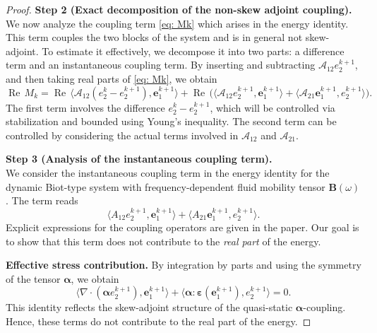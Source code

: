 \documentclass[pdflatex,sn-mathphys-num]{sn-jnl}
\theoremstyle{thmstyleone}%
\theoremstyle{thmstyletwo}%
\theoremstyle{thmstylethree}%
\newcommand{\ip}[2]{\langle #1, #2\rangle}
\newcommand{\Ree}{\operatorname{Re}}
\theoremstyle{definition}
\begin{document}
\begin{proof}[Proof]
		\noindent\textbf{Step 2 (Exact decomposition of the non-skew adjoint coupling).} \\
		\color{black}
		We now analyze the coupling term \eqref{eq: Mk}
		which arises in the energy identity. This term couples the two blocks of the system and is in general not skew-adjoint. To estimate it effectively, we decompose it into two parts: a difference term and an instantaneous coupling term. By inserting and subtracting \( \mathcal{A}_{12} e_2^{k+1} \),
		and then taking real parts of \eqref{eq: Mk}, we obtain 
		\begin{equation}\label{eq:Msplit}
			\Ree\,M_k
			= \Ree\,\ip{\mathcal{A}_{12}(e_2^{k}-e_2^{k+1})}{\bm{e}_{1}^{k+1}}
			+ \Ree\,\big(\ip{\mathcal{A}_{12} e_2^{k+1}}{\bm{e}_{1}^{k+1}} + \ip{\mathcal{A}_{21} \bm{e}_{1}^{k+1}}{e_2^{k+1}}\big).
		\end{equation}
		The first term involves the difference \( e_2^k - e_2^{k+1} \), which will be controlled via stabilization and bounded using Young’s inequality. The second term can be controlled by considering the actual terms involved in $\mathcal{A}_{12}$ and $\mathcal{A}_{21}$.
		


		\noindent\textbf{Step 3 (Analysis of the instantaneous coupling term).} \\
		We consider the instantaneous coupling term in the energy identity for the dynamic Biot-type system with frequency-dependent fluid mobility tensor $\mathbf{B}(\omega)$. The term reads
		\[
		\langle A_{12} e^{k+1}_2, \mathbf{e}^{k+1}_1 \rangle 
		+ \langle A_{21} \mathbf{e}^{k+1}_1, e^{k+1}_2 \rangle.
		\]
		Explicit expressions for the coupling operators are given in the paper. Our goal is to show that this term does not contribute to the \emph{real part} of the energy.
		
		\medskip
		
		\noindent
		\textbf{Effective stress contribution.}
		By integration by parts and using the symmetry of the tensor $\boldsymbol{\alpha}$, we obtain
		\[
		\langle \nabla \cdot (\boldsymbol{\alpha} e^{k+1}_2), \mathbf{e}^{k+1}_1 \rangle
		+\langle \boldsymbol{\alpha} : \boldsymbol{\varepsilon}(\mathbf{e}^{k+1}_1), e^{k+1}_2 \rangle = 0.
		\]
		This identity reflects the skew-adjoint structure of the quasi-static $\boldsymbol{\alpha}$-coupling. Hence, these terms do not contribute to the real part of the energy.
		

\end{proof}
\end{document}
